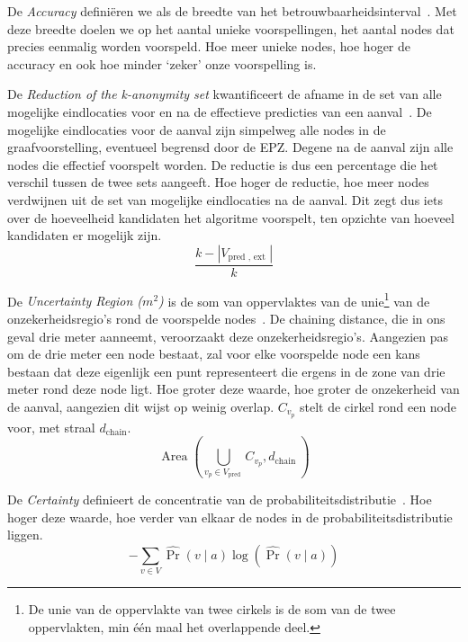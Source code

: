 De \textit{Accuracy} definiëren we als de breedte van het
betrouwbaarheidsinterval~\cite{Dhondt, Verdonck_2022}. Met deze breedte doelen
we op het aantal unieke voorspellingen, het aantal nodes dat precies eenmalig
worden voorspeld. Hoe meer unieke nodes, hoe hoger de accuracy en ook hoe
minder `zeker' onze voorspelling is.

De \textit{Reduction of the k-anonymity set} kwantificeert de afname in de set
van alle mogelijke eindlocaties voor en na de effectieve predicties van een
aanval~\cite{Dhondt, Verdonck_2022}. De mogelijke eindlocaties voor de aanval
zijn simpelweg alle nodes in de graafvoorstelling, eventueel begrensd door de
\ac{EPZ}. Degene na de aanval zijn alle nodes die effectief voorspelt worden.
De reductie is dus een percentage die het verschil tussen de twee sets
aangeeft. Hoe hoger de reductie, hoe meer nodes verdwijnen uit de set van
mogelijke eindlocaties na de aanval. Dit zegt dus iets over de hoeveelheid
kandidaten het algoritme voorspelt, ten opzichte van hoeveel kandidaten er
mogelijk zijn.
\begin{equation}
    \frac{k-\left|V_{\text {pred }, \text { ext }}\right|}{k}\label{eq:reduction}
\end{equation}

De \textit{Uncertainty Region ($m^2$)} is de som van oppervlaktes van de
unie\footnote{De unie van de oppervlakte van twee cirkels is de som van de twee
    oppervlakten, min één maal het overlappende deel.} van de onzekerheidsregio's
rond de voorspelde nodes~\cite{Dhondt,Verdonck_2022}. De chaining distance, die
in ons geval drie meter aanneemt, veroorzaakt deze onzekerheidsregio's.
Aangezien pas om de drie meter een node bestaat, zal voor elke voorspelde node
een kans bestaan dat deze eigenlijk een punt representeert die ergens in de
zone van drie meter rond deze node ligt. Hoe groter deze waarde, hoe groter de
onzekerheid van de aanval, aangezien dit wijst op weinig overlap. $C_{v_p}$
stelt de cirkel rond een node voor, met straal $d_{\text{chain}}$.
\begin{equation}
    \operatorname{Area}\left(\bigcup_{v_p \in V_{\text {pred }}} C_{v_p}, d_{\text {chain }}\right)\label{eq:uncertainty}
\end{equation}

De \textit{Certainty} definieert de concentratie van de
probabiliteitsdistributie~\cite{Dhondt}. Hoe hoger deze waarde, hoe verder van
elkaar de nodes in de probabiliteitsdistributie liggen.
\begin{equation}
    -\sum_{v \in V} \widehat{\operatorname{Pr}}(v \mid a) \log (\widehat{\operatorname{Pr}}(v \mid a))\label{eq:certainty}
\end{equation}

